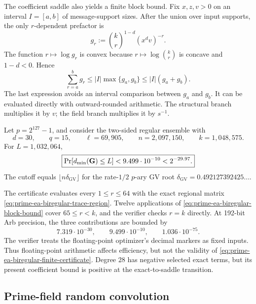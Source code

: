 The coefficient saddle also yields a finite block bound.  Fix $x,z,v>0$ on
an interval $I=[a,b]$ of message-support sizes.  After the union over input
supports, the only $r$-dependent prefactor is
\begin{equation}
 g_r:=\binom{k}{r}^{1-d}(x^dv)^{-r}.
 \label{eq:prime-ea-biregular-block-factor}
\end{equation}
The function $r\mapsto\log g_r$ is convex because
$r\mapsto\log\binom kr$ is concave and $1-d<0$.  Hence
\begin{equation}
 \sum_{r=a}^b g_r
 \leq |I|\max\{g_a,g_b\}
 \leq |I|(g_a+g_b).
 \label{eq:prime-ea-biregular-block-bound}
\end{equation}
The last expression avoids an interval comparison between $g_a$ and $g_b$.
It can be evaluated directly with outward-rounded arithmetic.  The structural
branch multiplies it by $v$; the field branch multiplies it by $s^{-1}$.

\begin{theorem}
\label{thm:prime-ea-biregular-finite-certificate}
Let $p=2^{127}-1$, and consider the two-sided regular ensemble with
\[
 d=30,\qquad q=15,\qquad \ell=69{,}905,\qquad
 n=2{,}097{,}150,\qquad k=1{,}048{,}575.
\]
For $L=1{,}032{,}064$,
\begin{equation}
 \boxed{
 \Pr[d_{\min}(\mathbf G)\leq L]
 <9.499\cdot10^{-10}<2^{-29.97}.
 }
 \label{eq:prime-ea-biregular-finite-certificate}
\end{equation}
The cutoff equals $\lfloor n\delta_{\mathrm{GV}}\rfloor$ for the rate-$1/2$
$p$-ary GV root $\delta_{\mathrm{GV}}=0.492127392425\ldots$.
\end{theorem}

The certificate evaluates every $1\leq r\leq64$ with the exact regional
matrix \eqref{eq:prime-ea-biregular-trace-region}.  Twelve applications of
\eqref{eq:prime-ea-biregular-block-bound} cover $65\leq r<k$, and the verifier
checks $r=k$ directly.  At 192-bit Arb precision, the three contributions are
bounded by
\[
 7.319\cdot10^{-30},\qquad
 9.499\cdot10^{-10},\qquad
 1.036\cdot10^{-75}.
\]
The verifier treats the floating-point optimizer's decimal markers as fixed
inputs.  Thus floating-point arithmetic affects efficiency, but not the
validity of \eqref{eq:prime-ea-biregular-finite-certificate}.  Degree $28$
has negative selected exact terms, but its present coefficient bound is
positive at the exact-to-saddle transition.

\subsection{Prime-field random convolution}

